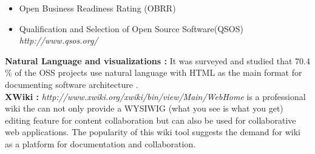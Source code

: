 \begin{itemize}
\item Open Business Readiness Rating (OBRR)\cite{Golden2006}
\item Qualification and Selection of Open Source Software(QSOS) \emph{http://www.qsos.org/}
\end{itemize}
\indent \textbf{Natural Language and visualizations : } It was surveyed and studied that 70.4 \% of the OSS projects use natural language with HTML as the main format for documenting software architecture \cite{6923128}. 
\newline
\\\indent \textbf{XWiki : } \emph{http://www.xwiki.org/xwiki/bin/view/Main/WebHome} is a professional wiki the can not only provide a WYSIWIG (what you see is what you get) editing feature for content collaboration but can also be used for collaborative web applications. The popularity of this wiki tool suggests the demand for wiki as a platform for documentation and collaboration.

